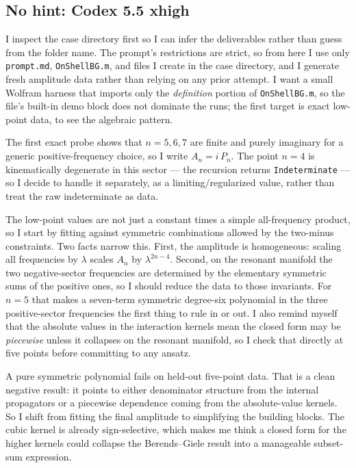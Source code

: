 \documentclass{article}
\begin{document}
\clearpage
\subsection{No hint: Codex 5.5 xhigh}
\label{app:log:case3:codex-55}

I inspect the case directory first so I can infer the deliverables rather than
guess from the folder name. The prompt's restrictions are strict, so from here I
use only \texttt{prompt.md}, \texttt{OnShellBG.m}, and files I create in the case
directory, and I generate fresh amplitude data rather than relying on any prior
attempt. I want a small Wolfram harness that imports only the \emph{definition}
portion of \texttt{OnShellBG.m}, so the file's built-in demo block does not
dominate the runs; the first target is exact low-point data, to see the algebraic
pattern.

The first exact probe shows that $n=5,6,7$ are finite and purely imaginary for a
generic positive-frequency choice, so I write $A_n=i\,P_n$. The point $n=4$ is
kinematically degenerate in this sector --- the recursion returns
\texttt{Indeterminate} --- so I decide to handle it separately, as a
limiting/regularized value, rather than treat the raw indeterminate as data.

The low-point values are not just a constant times a simple all-frequency
product, so I start by fitting against symmetric combinations allowed by the
two-minus constraints. Two facts narrow this. First, the amplitude is
homogeneous: scaling all frequencies by $\lambda$ scales $A_n$ by
$\lambda^{2n-4}$. Second, on the resonant manifold the two negative-sector
frequencies are determined by the elementary symmetric sums of the positive
ones, so I should reduce the data to those invariants. For $n=5$ that makes a
seven-term symmetric degree-six polynomial in the three positive-sector
frequencies the first thing to rule in or out. I also remind myself that the
absolute values in the interaction kernels mean the closed form may be
\emph{piecewise} unless it collapses on the resonant manifold, so I check that
directly at five points before committing to any ansatz.

A pure symmetric polynomial fails on held-out five-point data. That is a clean
negative result: it points to either denominator structure from the internal
propagators or a piecewise dependence coming from the absolute-value kernels. So
I shift from fitting the final amplitude to simplifying the building blocks. The
cubic kernel is already sign-selective, which makes me think a closed form for
the higher kernels could collapse the Berends--Giele result into a manageable
subset-sum expression.
\end{document}
